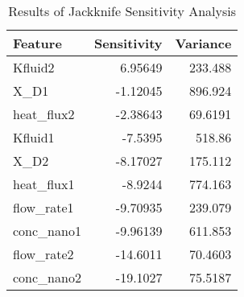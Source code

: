 
        \begin{table*}
            \centering
            \begin{tabular}{lrr}
\hline
 Feature    &   Sensitivity &   Variance \\
\hline
 Kfluid2    &       6.95649 &   233.488  \\
 X_D1       &      -1.12045 &   896.924  \\
 heat_flux2 &      -2.38643 &    69.6191 \\
 Kfluid1    &      -7.5395  &   518.86   \\
 X_D2       &      -8.17027 &   175.112  \\
 heat_flux1 &      -8.9244  &   774.163  \\
 flow_rate1 &      -9.70935 &   239.079  \\
 conc_nano1 &      -9.96139 &   611.853  \\
 flow_rate2 &     -14.6011  &    70.4603 \\
 conc_nano2 &     -19.1027  &    75.5187 \\
\hline
\end{tabular}
            \caption{Results of Jackknife Sensitivity Analysis}
            \label{table-jackknife}
        \end{table*}
        
